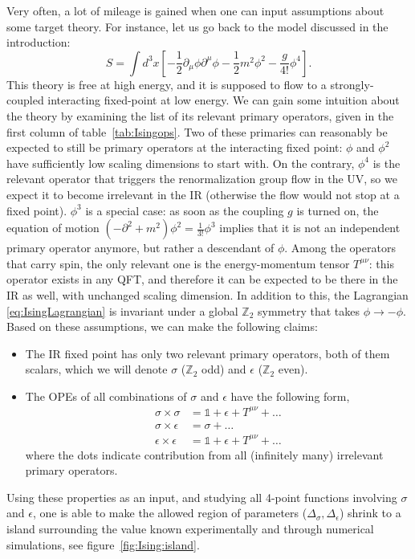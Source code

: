 \documentclass[a4paper,12pt]{article}
\numberwithin{equation}{section}
\begin{document}
Very often, a lot of mileage is gained when one can input assumptions about some target theory. For instance, let us go back to the model discussed in the introduction:
\begin{equation}
	S = \int d^3x \left[
	-\frac{1}{2} \partial_\mu \phi \partial^\mu \phi
	- \frac{1}{2} m^2 \phi^2 - \frac{g}{4!} \phi^4 \right].
	\label{eq:IsingLagrangian}
\end{equation}
This theory is free at high energy, and it is supposed to flow to a strongly-coupled interacting fixed-point at low energy.
We can gain some intuition about the theory by examining the list of its relevant primary operators, given in the first column of table~\ref{tab:Isingops}. Two of these primaries can reasonably be expected to still be primary operators at the interacting fixed point: $\phi$ and $\phi^2$ have sufficiently low scaling dimensions to start with. On the contrary, $\phi^4$ is the relevant operator that triggers the renormalization group flow in the UV, so we expect it to become irrelevant in the IR (otherwise the flow would not stop at a fixed point). $\phi^3$ is a special case: as soon as the coupling $g$ is turned on, the equation of motion $(-\partial^2 + m^2) \phi^2 = \frac{1}{3!} \phi^3$ implies that it is not an independent primary operator anymore, but rather a descendant of $\phi$.
Among the operators that carry spin, the only relevant one is the energy-momentum tensor $T^{\mu\nu}$: this operator exists in any QFT, and therefore it can be expected to be there in the IR as well, with unchanged scaling dimension.
In addition to this, the Lagrangian \eqref{eq:IsingLagrangian} is invariant under a global $\mathbb{Z}_2$ symmetry that takes $\phi \to -\phi$. Based on these assumptions, we can make the following claims:
\begin{itemize}

\item
The IR fixed point has only two relevant primary operators, both of them scalars, which we will denote $\sigma$ ($\mathbb{Z}_2$ odd) and $\epsilon$ ($\mathbb{Z}_2$ even).

\item
The OPEs of all combinations of $\sigma$ and $\epsilon$ have the following form,
\begin{align}
	\sigma \times \sigma &= \mathds{1} + \epsilon + T^{\mu\nu} + \ldots
	\nonumber \\
	\sigma \times \epsilon &= \sigma + \ldots
	\label{eq:IsingOPE}
	\\
	\epsilon \times \epsilon &=
	\mathds{1} + \epsilon + T^{\mu\nu} + \ldots
	\nonumber
\end{align}
where the dots indicate contribution from all (infinitely many) irrelevant primary operators.

\end{itemize}
%
Using these properties as an input, and studying all 4-point functions involving $\sigma$ and $\epsilon$, one is able to make the allowed region of parameters ($\Delta_\sigma, \Delta_\epsilon$) shrink to a island surrounding the value known experimentally and through numerical simulations, see figure~\ref{fig:Ising:island}.
\end{document}
